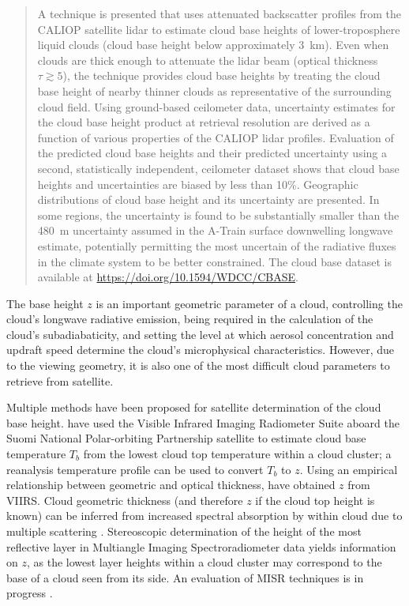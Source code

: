 \documentclass[essd,manuscript]{copernicus}\usepackage[]{graphicx}\usepackage[]{color}
\newcommand\CBH{\ensuremath{z}}
\begin{document}
\begin{abstract}
  A technique is presented that uses attenuated backscatter profiles from the
  CALIOP satellite lidar to estimate cloud base heights of lower-troposphere
  liquid clouds (cloud base height below approximately 3~\unit{km}).  Even when clouds are
  thick enough to attenuate the lidar beam (optical thickness $\tau \gtrsim 5$),
  the technique provides cloud base heights by treating the cloud base height of
  nearby thinner clouds as representative of the surrounding cloud field.  Using
  ground-based ceilometer data, uncertainty estimates for the cloud base height
  product at retrieval resolution are derived as a function of various
  properties of the CALIOP lidar profiles.  Evaluation of the predicted cloud
  base heights and their predicted uncertainty using a second, statistically
  independent, ceilometer dataset shows that cloud base heights and
  uncertainties are biased by less than 10\%.  Geographic distributions of cloud
  base height and its uncertainty are presented.  In some regions, the
  uncertainty is found to be substantially smaller than the 480~\unit{m}
  uncertainty assumed in the A-Train surface downwelling longwave estimate,
  potentially permitting the most uncertain of the radiative fluxes in the
  climate system to be better constrained.  The cloud base dataset is available
  at \url{https://doi.org/10.1594/WDCC/CBASE}.
\end{abstract}

\introduction  %
\label{sec:intro}
The base height \CBH{} is an important geometric parameter of a cloud,
controlling the cloud's longwave radiative emission, being required in the
calculation of the cloud's subadiabaticity, and setting the level at which
aerosol concentration and updraft speed determine the cloud's microphysical
characteristics.  However, due to the viewing geometry, it is also one of the
most difficult cloud parameters to retrieve from satellite.

Multiple methods have been proposed for satellite determination of the cloud
base height.  \cite{Zhu2014} have used the Visible Infrared Imaging Radiometer Suite
aboard the Suomi National Polar-orbiting Partnership satellite
\citep[VIIRS,][]{Cao2014} to estimate cloud base temperature $T_b$ from the
lowest cloud top temperature within a cloud cluster; a reanalysis temperature
profile can be used to convert $T_b$ to \CBH{}.  Using an empirical relationship
between geometric and optical thickness, \cite{Fitch2016} have obtained \CBH{} from
VIIRS.  Cloud geometric thickness (and therefore \CBH{} if the cloud top height is
known) can be inferred from increased spectral absorption by  within cloud
due to multiple scattering \citep{Kokhanovsky2005,Lelli2018}.  Stereoscopic determination of
the height of the most reflective layer \citep{Naud2005,Naud2007} in Multiangle
Imaging Spectroradiometer data \citep[MISR,][]{Diner1998} yields information on
\CBH{}, as the lowest layer heights within a cloud cluster may correspond to the
base of a cloud seen from its side.  An evaluation of MISR
techniques is in progress \citep{Boehm2017}.
  
\end{document}
